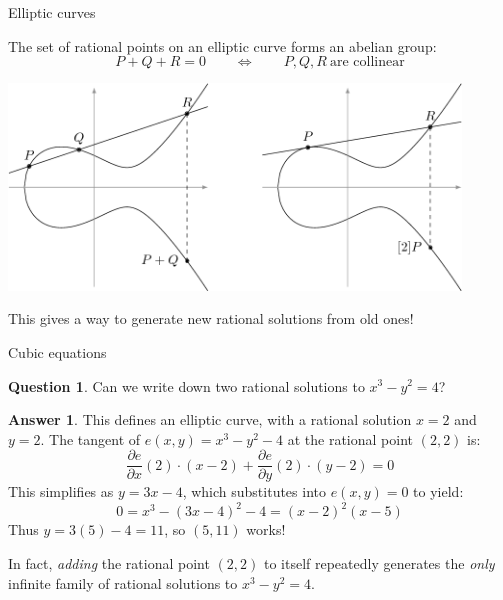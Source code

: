 \documentclass[10pt]{beamer}
\theoremstyle{definition}
\newtheorem{answer}{Answer}
\newtheorem{question}{Question}
\begin{document}
\begin{frame}[t]{Elliptic curves}

The set of rational points on an elliptic curve forms an abelian group:
$$ P + Q + R = 0 \qquad \iff \qquad P, Q, R \ \text{are collinear} $$

\begin{center}
\includegraphics[width=0.9\textwidth]{grouplaw.png}
\end{center}

This gives a way to generate new rational solutions from old ones!

\end{frame}

\begin{frame}[t]{Cubic equations}

\begin{question}
Can we write down two rational solutions to $ x^3 - y^2 = 4 $?
\end{question}

\begin{answer}
This defines an elliptic curve, with a rational solution $ x = 2 $ and $ y = 2 $. The tangent of $ e(x, y) = x^3 - y^2 - 4 $ at the rational point $ (2, 2) $ is:
$$ \dfrac{\partial e}{\partial x}(2) \cdot (x - 2) + \dfrac{\partial e}{\partial y}(2) \cdot (y - 2) = 0 $$
This simplifies as $ y = 3x - 4 $, which substitutes into $ e(x, y) = 0 $ to yield:
$$ 0 = x^3 - (3x - 4)^2 - 4 = (x - 2)^2(x - 5) $$
Thus $ y = 3(5) - 4 = 11 $, so $ (5, 11) $ works!
\end{answer}

\vspace{0.5cm} In fact, \emph{adding} the rational point $ (2, 2) $ to itself repeatedly generates the \emph{only} infinite family of rational solutions to $ x^3 - y^2 = 4 $.

\end{frame}
\end{document}
